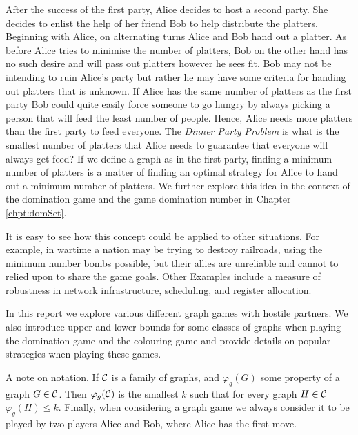 After the success of the first party, Alice decides to host a second party. She decides to enlist the help of her friend Bob to help distribute the platters. Beginning with Alice, on alternating turns Alice and Bob hand out a platter. As before Alice tries to minimise the number of platters, Bob on the other hand has no such desire and will pass out platters however he sees fit. Bob may not be intending to ruin Alice's party but rather he may have some criteria for handing out platters that is unknown. If Alice has the same number of platters as the first party Bob could quite easily force someone to go hungry by always picking a person that will feed the least number of people. Hence, Alice needs more platters than the first party to feed everyone. The \textit{Dinner Party Problem} is what is the smallest number of platters that Alice needs to guarantee that everyone will always get feed? If we define a graph as in the first party, finding a minimum number of platters is a matter of finding an optimal strategy for Alice to hand out a minimum number of platters. We further explore this idea in the context of the domination game and the game domination number in Chapter \ref{chpt:domSet}.

It is easy to see how this concept could be applied to other situations. For example, in wartime a nation may be trying to destroy railroads, using the minimum number bombs possible, but their allies are unreliable and cannot to relied upon to share the game goals. Other Examples include a measure of robustness in network infrastructure, scheduling, and register allocation.  

In this report %
we explore various different graph games with hostile partners. We also introduce upper and lower bounds for some classes of graphs when playing the domination game and the colouring game and provide details on popular strategies when playing these games.






  
    
A note on notation. If $\mathcal{C}$ is a family of graphs, and $\varphi_g(G)$ some property of a graph $G \in \mathcal{C}$. Then $\varphi_g(\mathcal{C})$ is the smallest $k$ such that for every graph $H\in\mathcal{C}$ $\varphi_g(H)\leq k$. Finally, when considering a graph game we always consider it to be played by two players Alice and Bob, where Alice has the first move.     

    
    
    
    
    
    
    
    
    
    
    
    
    
    
    
    
    
    
    
    
    